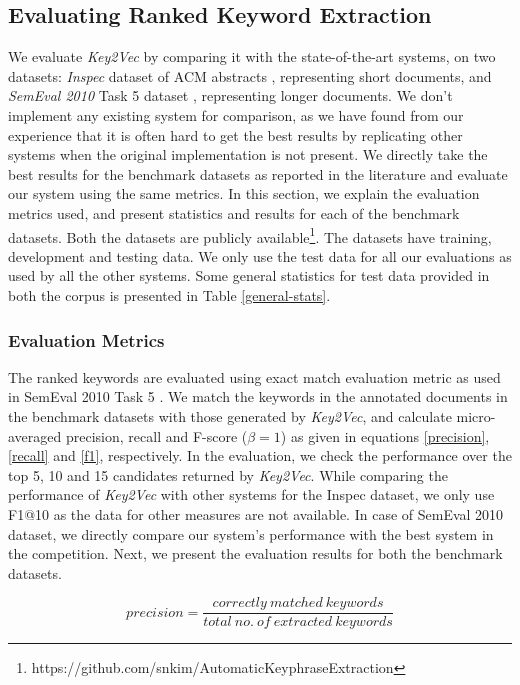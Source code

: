 \documentclass[conference]{IEEEtran}
\begin{document}
\subsection{Evaluating Ranked Keyword Extraction}
We evaluate \textit{Key2Vec} by comparing it with the state-of-the-art systems, on two datasets: \textit{Inspec} dataset of ACM abstracts \cite{hulth2003improved}, representing short documents, and \textit{SemEval 2010} Task 5 dataset \cite{kim2010semeval}, representing longer documents. We don't implement any existing system for comparison, as we have found from our experience that it is often hard to get the best results by replicating other systems when the original implementation is not present. We directly take the best results for the benchmark datasets as reported in the literature and evaluate our system using the same metrics. In this section, we explain the evaluation metrics used, and present statistics and results for each of the benchmark datasets. Both the datasets are publicly available\footnote{https://github.com/snkim/AutomaticKeyphraseExtraction}. The datasets have training, development and testing data. We only use the test data for all our evaluations as used by all the other systems. Some general statistics for test data provided in both the corpus is presented in Table \ref{general-stats}.




\subsubsection{Evaluation Metrics}
The ranked keywords are evaluated using exact match evaluation metric as used in SemEval 2010 Task 5 \cite{kim2010semeval}. We match the keywords in the annotated documents in the benchmark datasets with those generated by \textit{Key2Vec}, and calculate micro-averaged precision, recall and F-score ($\beta= 1$) as given in equations \ref{precision}, \ref{recall} and \ref{f1}, respectively. In the evaluation, we check the performance over the top 5, 10 and 15 candidates returned by \textit{Key2Vec}. While comparing the performance of \textit{Key2Vec} with other systems for the Inspec dataset, we only use F1@10 as the data for other measures are not available. In case of SemEval 2010 dataset, we directly compare our system's performance with the best system in the competition. Next, we present the evaluation results for both the benchmark datasets.

\begin{equation}
precision = \frac{correctly \ matched \ keywords}{total \ no. \ of \ extracted \ keywords}
\label{precision}
\end{equation}
\end{document}

